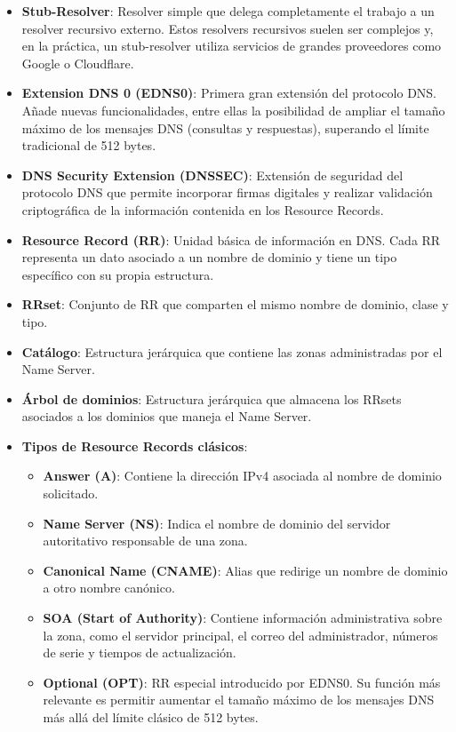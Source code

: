 \begin{itemize}

    \item \textbf{Stub-Resolver}: Resolver simple que delega completamente el trabajo a un resolver recursivo externo. Estos resolvers recursivos suelen ser complejos y, en la práctica, un 
           stub-resolver utiliza servicios de grandes proveedores como Google o Cloudflare.

    \item \textbf{Extension DNS 0 (EDNS0)}: Primera gran extensión del protocolo DNS. Añade nuevas funcionalidades, entre ellas la posibilidad de ampliar el tamaño máximo de los mensajes DNS 
          (consultas y respuestas), superando el límite tradicional de 512 bytes.

    \item \textbf{DNS Security Extension (DNSSEC)}: Extensión de seguridad del protocolo DNS que permite incorporar firmas digitales y realizar validación criptográfica de la información 
          contenida en los Resource Records.

    \item \textbf{Resource Record (RR)}: Unidad básica de información en DNS. Cada RR representa un dato asociado a un nombre de dominio y tiene un tipo específico con su propia estructura.

    \item \textbf{RRset}: Conjunto de RR que comparten el mismo nombre de dominio, clase y tipo.

    \item \textbf{Catálogo}: Estructura jerárquica que contiene las zonas administradas por el Name Server.

    \item \textbf{Árbol de dominios}: Estructura jerárquica que almacena los RRsets asociados a los dominios que maneja el Name Server.

    \item \textbf{Tipos de Resource Records clásicos}:
        \begin{itemize}
            \item \textbf{Answer (A)}: Contiene la dirección IPv4 asociada al nombre de dominio solicitado.
            \item \textbf{Name Server (NS)}: Indica el nombre de dominio del servidor autoritativo responsable de una zona.
            \item \textbf{Canonical Name (CNAME)}: Alias que redirige un nombre de dominio a otro nombre canónico.
            \item \textbf{SOA (Start of Authority)}: Contiene información administrativa sobre la zona, como el servidor principal, el correo del administrador, 
                  números de serie y tiempos de actualización.
            \item \textbf{Optional (OPT)}: RR especial introducido por EDNS0. Su función más relevante es permitir aumentar el tamaño máximo de los mensajes DNS más allá del límite clásico de 
                  512 bytes.
        \end{itemize}


\end{itemize}
